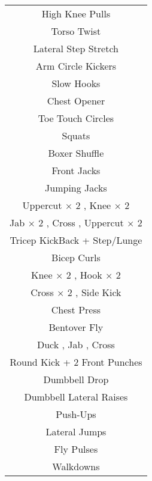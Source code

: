 \documentclass[12pt]{article}
\newcommand\myPadding{1.5}
\begin{document}
\begin{center}
  \bgroup
  \def\arraystretch{\myPadding}%
  \begin{tabular}{ c  }
  High Knee Pulls
  \\
  Torso Twist
  \\
  Lateral Step Stretch
  \\
  Arm Circle Kickers
  \\
  Slow Hooks
  \\
  Chest Opener
  \\
  Toe Touch Circles
  \\
  Squats
  \\
  Boxer Shuffle
  \\
  Front Jacks
  \\
  Jumping Jacks
  \\
  Uppercut $\times$ 2 , Knee $\times$ 2 
  \\
  Jab $\times$ 2 , Cross , Uppercut $\times$ 2 
  \\
  Tricep KickBack + Step/Lunge
  \\
  Bicep Curls
  \\
  Knee $\times$ 2 , Hook $\times$ 2 
  \\
  Cross $\times$ 2 , Side Kick
  \\
  Chest Press
  \\
  Bentover Fly
  \\
  Duck , Jab , Cross
  \\
  Round Kick + 2 Front Punches
  \\
  Dumbbell Drop
  \\
  Dumbbell Lateral Raises
  \\
  Push-Ups
  \\
  Lateral Jumps
  \\
  Fly Pulses
  \\
  Walkdowns
  \end{tabular}
  \egroup
\end{center}
\end{document}
